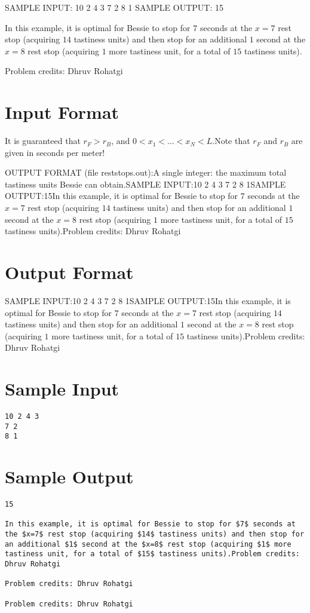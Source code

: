 \documentclass[12pt]{article}
\begin{document}
SAMPLE INPUT:
10 2 4 3
7 2
8 1
SAMPLE OUTPUT: 
15

In this example, it is optimal for Bessie to stop for $7$ seconds at the $x=7$ rest stop (acquiring $14$ tastiness units) and then stop for an additional $1$ second at the $x=8$ rest stop (acquiring $1$ more tastiness unit, for a total of $15$ tastiness units).


Problem credits: Dhruv Rohatgi



\section*{Input Format}
It is guaranteed that $r_F > r_B$, and $0 < x_1 < \dots < x_N < L $.Note
that $r_F$ and $r_B$ are given in seconds per meter!

OUTPUT FORMAT (file reststops.out):A single integer: the maximum total tastiness units Bessie can obtain.SAMPLE INPUT:10 2 4 3
7 2
8 1SAMPLE OUTPUT:15In this example, it is optimal for Bessie to stop for $7$ seconds at the $x=7$ rest stop (acquiring $14$ tastiness units) and then stop for an additional $1$ second at the $x=8$ rest stop (acquiring $1$ more tastiness unit, for a total of $15$ tastiness units).Problem credits: Dhruv Rohatgi

\section*{Output Format}
SAMPLE INPUT:10 2 4 3
7 2
8 1SAMPLE OUTPUT:15In this example, it is optimal for Bessie to stop for $7$ seconds at the $x=7$ rest stop (acquiring $14$ tastiness units) and then stop for an additional $1$ second at the $x=8$ rest stop (acquiring $1$ more tastiness unit, for a total of $15$ tastiness units).Problem credits: Dhruv Rohatgi

\section*{Sample Input}
\begin{verbatim}
10 2 4 3
7 2
8 1
\end{verbatim}

\section*{Sample Output}
\begin{verbatim}
15

In this example, it is optimal for Bessie to stop for $7$ seconds at the $x=7$ rest stop (acquiring $14$ tastiness units) and then stop for an additional $1$ second at the $x=8$ rest stop (acquiring $1$ more tastiness unit, for a total of $15$ tastiness units).Problem credits: Dhruv Rohatgi

Problem credits: Dhruv Rohatgi

Problem credits: Dhruv Rohatgi
\end{verbatim}
\end{document}
